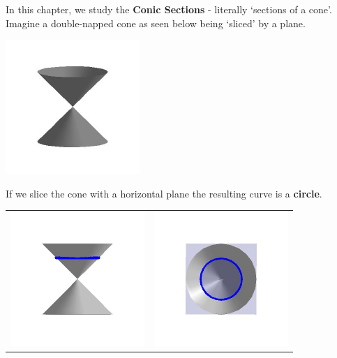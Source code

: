 \documentclass{ximera}
\begin{document}
	\author{Stitz-Zeager}




\setcounter{footnote}{0}

\label{IntrotoConics}

In this chapter, we study the  \textbf{Conic Sections} - literally `sections of a  cone'.  Imagine a double-napped cone as seen below being `sliced' by a plane. 

\centerline{\includegraphics[width=2in]{./IntrotoConicsGraphics/cone.jpg}}

If we slice the cone with a horizontal plane the resulting curve is a  \textbf{circle}.

\begin{center}

\begin{tabular}{cc}

\includegraphics[width=2in]{./IntrotoConicsGraphics/Circle01.jpg} & \includegraphics[width=2in]{./IntrotoConicsGraphics/Circle02.jpg} \\

\end{tabular}

\end{center}
\end{document}
